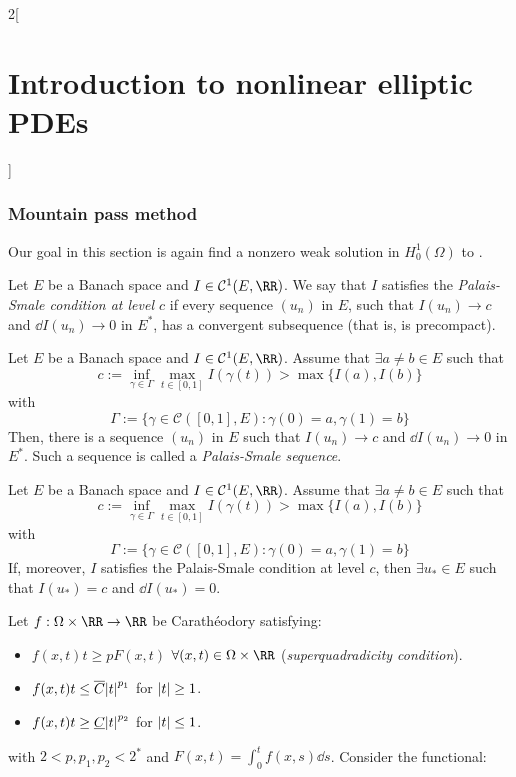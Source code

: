 \documentclass[../../../main_math.tex]{subfiles}
\begin{document}
\begin{multicols}{2}[\section{Introduction to nonlinear elliptic PDEs}]
  \subsubsection{Mountain pass method}
  Our goal in this section is again find a nonzero weak solution in $H_0^1(\Omega)$ to .
  \begin{definition}
    Let $E$ be a Banach space and $I\in\mathcal{C}^1(E,\RR)$. We say that $I$ satisfies the \emph{Palais-Smale condition at level $c$} if every sequence $(u_n)$ in $E$, such that $I(u_n)\to c$ and $\dd{I(u_n)}\to 0$ in $E^*$, has a convergent subsequence (that is, is precompact).
  \end{definition}
  \begin{theorem}
    Let $E$ be a Banach space and $I\in\mathcal{C}^1(E,\RR)$. Assume that $\exists a\ne b\in E$ such that
    $$
      c:=\inf_{\gamma\in \Gamma}\max_{t\in [0,1]}I(\gamma(t))>\max\{I(a),I(b)\}
    $$
    with $$
      \Gamma:=\{\gamma\in \mathcal{C}([0,1],E):\gamma(0)=a,\gamma(1)=b\}
    $$
    Then, there is a sequence $(u_n)$ in $E$ such that $I(u_n)\to c$ and $\dd{I(u_n)}\to 0$ in $E^*$. Such a sequence is called a \emph{Palais-Smale sequence}.
  \end{theorem}
  \begin{corollary}\label{INEPDE:mountain_pass}
    Let $E$ be a Banach space and $I\in\mathcal{C}^1(E,\RR)$. Assume that $\exists a\ne b\in E$ such that
    $$
      c:=\inf_{\gamma\in \Gamma}\max_{t\in [0,1]}I(\gamma(t))>\max\{I(a),I(b)\}
    $$
    with $$
      \Gamma:=\{\gamma\in \mathcal{C}([0,1],E):\gamma(0)=a,\gamma(1)=b\}
    $$
    If, moreover, $I$ satisfies the Palais-Smale condition at level $c$, then $\exists u_*\in E$ such that $I(u_*)=c$ and $\dd{I(u_*)}=0$.
  \end{corollary}
  \begin{proposition}
    Let $f:\Omega\times \RR\to\RR$ be Carathéodory satisfying:
    \begin{itemize}
      \item $f(x,t)t\geq p F(x,t)$ $\forall (x,t)\in \Omega\times \RR$ (\emph{superquadradicity condition}).
      \item $f(x,t)t\leq \overline{C}\abs{t}^{p_1}$ for $\abs{t}\geq 1$.
      \item $f(x,t)t\geq \underline{C} \abs{t}^{p_2}$ for $\abs{t}\leq 1$.
    \end{itemize}
    with $2<p,p_1,p_2<2^*$ and $F(x,t)=\int_0^tf(x,s)\dd{s}$. Consider the functional:

\end{proposition}
\end{multicols}
\end{document}
